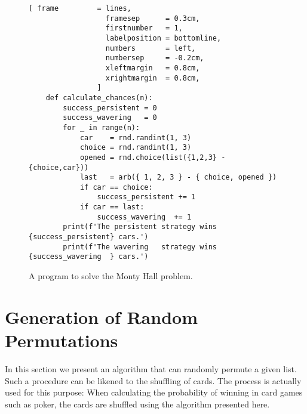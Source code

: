 \begin{figure}[!ht]
\centering
\begin{Verbatim}[ frame         = lines, 
                  framesep      = 0.3cm, 
                  firstnumber   = 1,
                  labelposition = bottomline,
                  numbers       = left,
                  numbersep     = -0.2cm,
                  xleftmargin   = 0.8cm,
                  xrightmargin  = 0.8cm,
                ]
    def calculate_chances(n):
        success_persistent = 0
        success_wavering   = 0
        for _ in range(n):
            car    = rnd.randint(1, 3)
            choice = rnd.randint(1, 3) 
            opened = rnd.choice(list({1,2,3} - {choice,car}))
            last   = arb({ 1, 2, 3 } - { choice, opened })
            if car == choice:
                success_persistent += 1
            if car == last:
                success_wavering  += 1
        print(f'The persistent strategy wins {success_persistent} cars.')
        print(f'The wavering   strategy wins {success_wavering  } cars.')
\end{Verbatim}
\vspace*{-0.3cm}
\caption{A program to solve the Monty Hall problem.}
\label{fig:Monty-Hall-Problem.ipynb}
\end{figure}





\section[Permutations]{Generation of Random Permutations}
In this section we present an algorithm that can randomly permute a given list.
Such a procedure can be likened to the shuffling of cards. The process is actually used for this purpose: When
calculating the probability of winning in card games such as poker, the cards are shuffled using the algorithm
presented here. 

